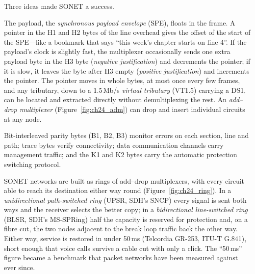 Three ideas made SONET a success.
\begin{description}[style=nextline,leftmargin=1.2em,font=\sffamily\bfseries\small\color{navy}]
\item[Pointers instead of stuffing.] The payload, the \emph{synchronous payload envelope} (SPE),
floats in the frame. A pointer in the H1 and H2 bytes of the line overhead gives the offset of the
start of the SPE---like a bookmark that says ``this week's chapter starts on line 4''. If the
payload's clock is slightly fast, the multiplexer occasionally sends one extra payload byte in the
H3 byte (\emph{negative justification}) and decrements the pointer; if it is slow, it leaves the
byte after H3 empty (\emph{positive justification}) and increments the pointer. The pointer moves
in whole bytes, at most once every few frames, and any tributary, down to a 1.5\,Mb/s \emph{virtual
tributary} (VT1.5) carrying a DS1, can be located and extracted directly without demultiplexing the
rest. An \emph{add--drop multiplexer} (Figure~\ref{fig:ch24_adm}) can drop and insert individual
circuits at any node.
\item[Generous overhead.] Bit-interleaved parity bytes (B1, B2, B3) monitor errors on each section,
line and path; trace bytes verify connectivity; data communication channels carry management
traffic; and the K1 and K2 bytes carry the automatic protection switching protocol.
\item[Survivable rings.] SONET networks are built as rings of add--drop multiplexers, with every
circuit able to reach its destination either way round (Figure~\ref{fig:ch24_ring}). In a
\emph{unidirectional path-switched ring} (UPSR, SDH's SNCP) every signal is sent both ways and the
receiver selects the better copy; in a \emph{bidirectional line-switched ring} (BLSR, SDH's
MS-SPRing) half the capacity is reserved for protection and, on a fibre cut, the two nodes adjacent
to the break loop traffic back the other way. Either way, service is restored in under 50\,ms
(Telcordia GR-253, ITU-T G.841), short enough that voice calls survive a cable cut with only a
click. The ``50\,ms'' figure became a benchmark that packet networks have been measured against
ever since.
\end{description}





